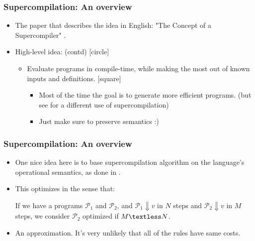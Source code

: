 \documentclass{beamer}
\begin{document}
\begin{frame}

    \frametitle{Supercompilation: An overview}

    \begin{itemize}
        \item The paper that describes the idea in English: "The Concept of a
            Supercompiler" \cite{Turchin86theconcept}.
        \item High-level idea: (contd)
            [circle]
            \begin{itemize}
                \item Evaluate programs in compile-time, while making the most
                    out of known inputs and definitions.
                    [square]
                    \begin{itemize}[<+->]
                        \item Most of the time the goal is to generate more
                            efficient programs. \newline
                            (but see \cite{Klyuchnikov2010proving} for a
                            different use of supercompilation)

                        \item Just make sure to preserve semantics :)
                    \end{itemize}
            \end{itemize}
    \end{itemize}

\end{frame}

\begin{frame}

    \frametitle{Supercompilation: An overview}

    \begin{itemize}[<+->]
        \item One nice idea here is to base supercompilation algorithm on the
            language's operational semantics, as done in \cite{SCbyEval}.

        \item This optimizes in the sense that:

            If we have a programs $\mathcal{P}_1$ and $\mathcal{P}_2$, and
            \newline
            $\mathcal{P}_1 \Downarrow v$ in $N$ steps and \newline
            $\mathcal{P}_2 \Downarrow v$ in $M$ steps, \newline
            we consider $\mathcal{P}_2$ optimized if $M \textless N$.

        \item An approximation. It's very unlikely that all of the rules have
            same costs.
    \end{itemize}

\end{frame}
\end{document}
